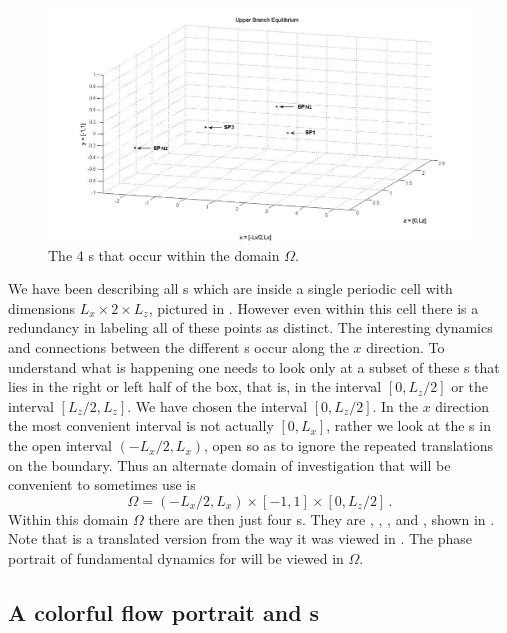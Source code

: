 \documentclass[lineno]{jfm}
\begin{document}
 \begin{figure}[!h]
\includegraphics[width=1.0\textwidth]{stagps2_edited.jpg}
  \caption{
   The 4 \stagp s that occur within the domain $\Omega$.
   }
  \label{fig:stagps_label2}
 \end{figure}

We have been describing all \stagp s which are inside a single periodic 
cell with dimensions $L_x \times 2 \times L_z$, pictured in 
. However even within this cell there is a 
redundancy in labeling all of these points as distinct. The interesting 
dynamics and connections between the different \stagp s occur along the 
$x$ direction. To understand what is happening one needs to look only at 
a subset of these \stagp s that lies in the right or left half of the 
box, that is, in the interval $[0,L_{z}/2]$ or the interval 
$[L_{z}/2,L_{z}]$. We have chosen the interval $[0,L_{z}/2]$. In the $x$ 
direction the most convenient interval is not actually $[0,L_{x}]$, 
rather we look at the \stagp s in the open interval $(-L_{x}/2,L_{x})$, 
open so as to ignore the repeated translations on the boundary. Thus an 
alternate domain of investigation that will be convenient to sometimes 
use is 
\[ %
\Omega = (-L_{x}/2,L_{x}) \times [-1,1] \times [0,L_{z}/2]
\,. 
\] %
Within this domain $\Omega$ there are then just four \stagp s. They 
are , , , and , shown in 
. Note that  is a translated 
version from the way it was viewed in . The 
phase portrait of fundamental dynamics for {\tEQtwo} will be viewed in 
$\Omega$.


\subsection{A colorful flow portrait and {\hc}s}
\end{document}
